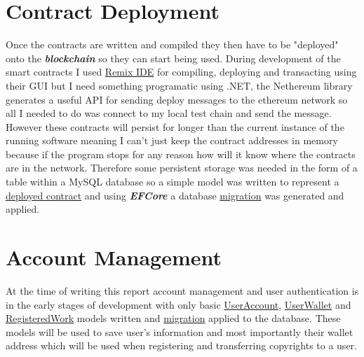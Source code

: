 \documentclass[12pt]{report}
\newcommand{\keyword}[1]{\textbf{\textit{#1}}}
\begin{document}

\section{Contract Deployment}

Once the contracts are written and compiled they then have to be "deployed" onto the \keyword{blockchain} so they can start being used. During development of the smart contracts I used \href{https://remix.ethereum.org}{Remix IDE} for compiling, deploying and transacting using their GUI but I need something programatic using .NET, the Nethereum library generates a useful API for sending deploy messages to the ethereum network so all I needed to do was connect to my local test chain and send the message. However these contracts will persist for longer than the current instance of the running software meaning I can't just keep the contract addresses in memory because if the program stops for any reason how will it know where the contracts are in the network. Therefore some persistent storage was needed in the form of a table within a MySQL database so a simple model was written to represent a \href{https://github.com/MrHarrisonBarker/CRPL/blob/main/CRPL.Data/ContractDeployment/DeployedContract.cs}{deployed contract} and using \keyword{EFCore} a database \href{https://github.com/MrHarrisonBarker/CRPL/blob/main/CRPL.Web/Migrations/20220123013118_DeployedContracts.cs}{migration} was generated and applied.

\section{Account Management}

At the time of writing this report account management and user authentication is in the early stages of development with only basic \href{https://github.com/MrHarrisonBarker/CRPL/blob/main/CRPL.Data/Account/UserAccount.cs}{UserAccount}, \href{https://github.com/MrHarrisonBarker/CRPL/blob/main/CRPL.Data/Account/UserWallet.cs}{UserWallet} and \href{https://github.com/MrHarrisonBarker/CRPL/blob/main/CRPL.Data/RegisteredWork.cs}{RegisteredWork} models written and \href{https://github.com/MrHarrisonBarker/CRPL/blob/main/CRPL.Web/Migrations/Application/20220123215316_UserAccountsAndWallets.cs}{migration} applied to the database. These models will be used to save user's information and most importantly their wallet address which will be used when registering and transferring copyrights to a user.
\end{document}
